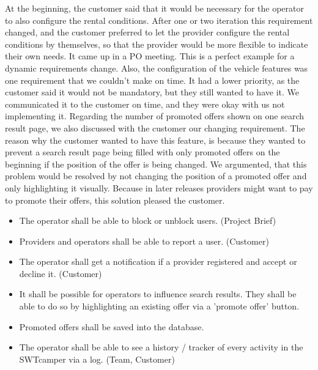 At the beginning, the customer said that it would be necessary for the operator to also configure the rental conditions.
After one or two iteration this requirement changed, and the customer preferred to let the provider configure the rental conditions by themselves, so that the provider would be more flexible to indicate their own needs.
It came up in a PO meeting.
This is a perfect example for a dynamic requirements change.
Also, the configuration of the vehicle features was one requirement that we couldn't make on time.
It had a lower priority, as the customer said it would not be mandatory, but they still wanted to have it.
We communicated it to the customer on time, and they were okay with us not implementing it.
Regarding the number of promoted offers shown on one search result page, we also discussed with the customer our changing requirement.
The reason why the customer wanted to have this feature, is because they wanted to prevent a search result page being filled with only promoted offers on the beginning if the position of the offer is being changed.
We argumented, that this problem would be resolved by not changing the position of a promoted offer and only highlighting it visually.
Because in later releases providers might want to pay to promote their offers, this solution pleased the customer.


\begin{itemize}
    \item The operator shall be able to block or unblock users. (Project Brief)
    \item Providers and operators shall be able to report a user. (Customer)
    \item The operator shall get a notification if a provider registered and accept or decline it. (Customer)
    \item It shall be possible for operators to influence search results. They shall be able to do so by highlighting an existing offer via a 'promote offer' button.
    \item Promoted offers shall be saved into the database.
    \item The operator shall be able to see a history / tracker of every activity in the SWTcamper via a log. (Team, Customer)
\end{itemize}


